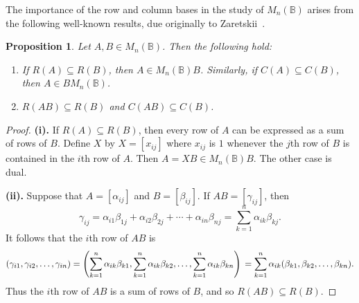 \documentclass[11pt]{article}
\newtheorem{prop}[thm]{Proposition}
\numberwithin{equation}{section}
\newcommand{\B}{\mathbb{B}}
\newcommand{\Bn}{M_n(\B)}
\begin{document}

The importance of the row and column bases in the study of $\Bn$ arises from the
following well-known results, due originally to
Zaretskii~\cite{Zaretskii1963aa}. 

\begin{prop}
  Let $A, B \in \Bn$. Then the following hold:
  \begin{enumerate}[label=\roman*]

    \item
      If $R(A) \subseteq R(B)$, then $A \in \Bn B$.  Similarly, if $C(A)
      \subseteq C(B)$, then $A \in B \Bn$.

    \item 
      $R(AB) \subseteq R(B)$ and $C(AB) \subseteq C(B)$.
  \end{enumerate}
\end{prop}
\begin{proof}
  \noindent \textbf{(i).}
  If $R(A) \subseteq R(B)$, then every row of $A$ can be expressed as a sum of
  rows of $B$. Define $X$ by $X = [x_{ij}]$ where $x_{ij}$ is $1$ whenever the
  $j$th row of $B$ is contained in the $i$th row of $A$. Then $A = XB \in \Bn
  B$.  The other case is dual.
  \bigskip

  \noindent \textbf{(ii).}
  Suppose that $A = [\alpha_{ij}]$ and $B = [\beta_{ij}]$. If 
  $AB = [\gamma_{ij}]$, then 
  \[
  \gamma_{ij} = \alpha_{i1} \beta_{1j} + \alpha_{i2}\beta_{2j} 
                + \cdots + \alpha_{in}\beta_{nj}
              = \sum_{k = 1} ^ {n} \alpha_{ik}\beta_{kj}.
  \]
  It follows that the $i$th row of $AB$ is 
  \[
  (\gamma_{i1}, \gamma_{i2}, \ldots, \gamma_{in})
   =  \left (\sum_{k = 1} ^ {n} \alpha_{ik}\beta_{k1},
     \sum_{k = 1} ^ {n} \alpha_{ik}\beta_{k2},
     \ldots, 
     \sum_{k = 1} ^ {n} \alpha_{ik}\beta_{kn}\right) \\
    =
    \sum_{k = 1} ^ {n} 
    \alpha_{ik}
    (\beta_{k1}, \beta_{k2}, \ldots, \beta_{kn}).
  \]
  Thus the $i$th row of $AB$ is a sum of rows of $B$, and so $R(AB) \subseteq
  R(B)$. 
\end{proof}
\end{document}
